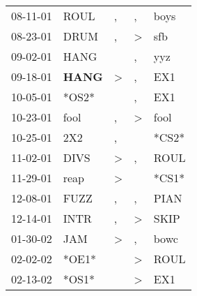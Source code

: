 \begin{supertabular}{p{0.07\textwidth}p{0.06\textwidth}p{0.02\textwidth}p{0.02\textwidth}p{0.06\textwidth}}
          08-11-01\textsuperscript{} &           ROUL\textsuperscript{} &                , &                , &           boys\textsuperscript{} \\
          08-23-01\textsuperscript{} &           DRUM\textsuperscript{} &                , &     \textgreater &            sfb\textsuperscript{} \\
          09-02-01\textsuperscript{} &           HANG\textsuperscript{} &                  &                , &            yyz\textsuperscript{} \\
          09-18-01\textsuperscript{} &  \textbf{HANG\textsuperscript{}} &     \textgreater &                , &            EX1\textsuperscript{} \\
          10-05-01\textsuperscript{} &                            *OS2* &                  &                , &            EX1\textsuperscript{} \\
          10-23-01\textsuperscript{} &           fool\textsuperscript{} &                , &     \textgreater &           fool\textsuperscript{} \\
          10-25-01\textsuperscript{} &            2X2\textsuperscript{} &                , &                  &                            *CS2* \\
          11-02-01\textsuperscript{} &           DIVS\textsuperscript{} &     \textgreater &                , &           ROUL\textsuperscript{} \\
          11-29-01\textsuperscript{} &           reap\textsuperscript{} &     \textgreater &                  &                            *CS1* \\
          12-08-01\textsuperscript{} &           FUZZ\textsuperscript{} &                , &                , &           PIAN\textsuperscript{} \\
          12-14-01\textsuperscript{} &           INTR\textsuperscript{} &                , &     \textgreater &           SKIP\textsuperscript{} \\
          01-30-02\textsuperscript{} &            JAM\textsuperscript{} &     \textgreater &                , &           bowc\textsuperscript{} \\
          02-02-02\textsuperscript{} &                            *OE1* &                  &     \textgreater &           ROUL\textsuperscript{} \\
          02-13-02\textsuperscript{} &                            *OS1* &                  &     \textgreater &            EX1\textsuperscript{} \\

\end{supertabular}
